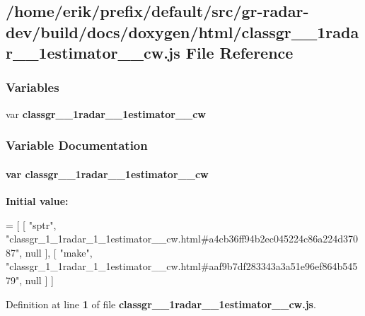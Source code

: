 \subsection{/home/erik/prefix/default/src/gr-\/radar-\/dev/build/docs/doxygen/html/classgr\+\_\+\_\+1radar\+\_\+\_\+1estimator\+\_\+\+\_\+cw.js File Reference}
\label{classgr__1__1radar__1__1estimator____cw_8js}
\subsubsection*{Variables}
\begin{DoxyCompactItemize}
\item 
var {\bf classgr\+\_\+\_\+1radar\+\_\+\_\+1estimator\+\_\+\+\_\+cw}
\end{DoxyCompactItemize}


\subsubsection{Variable Documentation}
\paragraph[{classgr\+\_\+1\+\_\+1radar\+\_\+1\+\_\+1estimator\+\_\+\+\_\+cw}]{\setlength{\rightskip}{0pt plus 5cm}var classgr\+\_\+\_\+1radar\+\_\+\_\+1estimator\+\_\+\+\_\+cw}\label{classgr__1__1radar__1__1estimator____cw_8js_ae175d763a46ae49b4b52f2b9b577b7de}
{\bfseries Initial value\+:}
\begin{DoxyCode}
=
[
    [ \textcolor{stringliteral}{"sptr"}, \textcolor{stringliteral}{"classgr\_1\_1radar\_1\_1estimator\_\_cw.html#a4cb36ff94b2ec045224c86a224d37087"}, null ],
    [ \textcolor{stringliteral}{"make"}, \textcolor{stringliteral}{"classgr\_1\_1radar\_1\_1estimator\_\_cw.html#aaf9b7df283343a3a51e96ef864b54579"}, null ]
]
\end{DoxyCode}


Definition at line {\bf 1} of file {\bf classgr\+\_\+\_\+1radar\+\_\+\_\+1estimator\+\_\+\+\_\+cw.\+js}.

